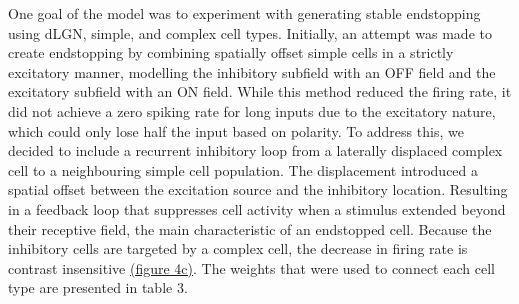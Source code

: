 \documentclass[12pt]{article}
\begin{document}
One goal of the model was to experiment with generating stable endstopping using dLGN, simple, and complex cell types. Initially, an attempt was made to create endstopping by combining spatially offset simple cells in a strictly excitatory manner, modelling the inhibitory subfield with an OFF field and the excitatory subfield with an ON field. While this method reduced the firing rate, it did not achieve a zero spiking rate for long inputs due to the excitatory nature, which could only lose half the input based on polarity. To address this, we decided to include a recurrent inhibitory loop from a laterally displaced complex cell to a neighbouring simple cell population. The displacement introduced a spatial offset between the excitation source and the inhibitory location. Resulting in a feedback loop that suppresses cell activity when a stimulus extended beyond their receptive field, the main characteristic of an endstopped cell. Because the inhibitory cells are targeted by a complex cell, the decrease in firing rate is contrast insensitive \hyperref[fig:LIF_connectivity]{(figure 4c)}. The weights that were used to connect each cell type are presented in table 3.  
\end{document}
